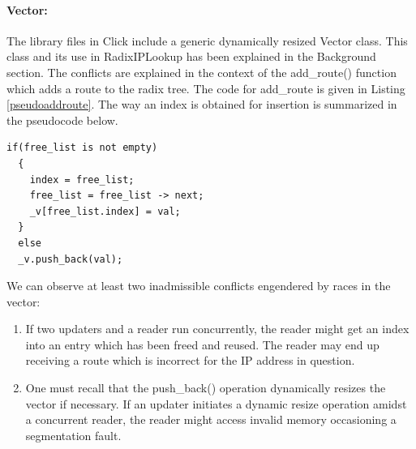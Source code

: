 \documentclass{article}
\begin{document}
\paragraph{Vector:}
The library files in Click include a generic dynamically resized Vector class. This class and its use in RadixIPLookup has been explained in the Background section. The conflicts are explained in the context of the add\_route() function which adds a route to the radix tree. The code for add\_route is given in Listing \ref{pseudoaddroute}. The way an index is obtained for insertion is summarized in the pseudocode below. 
\begin{lstlisting}[caption = Pseudocode for acquiring an index in add\_route, label=pseudoaddroute]
  if(free_list is not empty)
  {
    index = free_list;
    free_list = free_list -> next;
    _v[free_list.index] = val;
  }
  else 
  _v.push_back(val);
\end{lstlisting}
We can observe at least two inadmissible conflicts engendered by races in the vector:
\begin{enumerate}
\item If two updaters and a reader run concurrently, the reader might get an index into an entry which has been freed and reused. The reader may end up receiving a route which is incorrect for the IP address in question. 
\item One must recall that the push\_back() operation dynamically resizes the vector if necessary. If an updater initiates a dynamic resize operation amidst a concurrent reader, the reader might access invalid memory occasioning a segmentation fault.
\end{enumerate}
\end{document}
